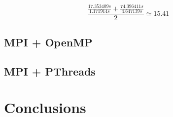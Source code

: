 \documentclass[11pt, journal]{IEEEtran}
\begin{document}
\[ \frac{\frac{17.353409s}{1.171914s} + \frac{74.396411s}{4.647139s}}{2} \simeq 15.41 \]

\subsection{MPI + OpenMP}

\subsection{MPI + PThreads}

\section{Conclusions}


\end{document}
